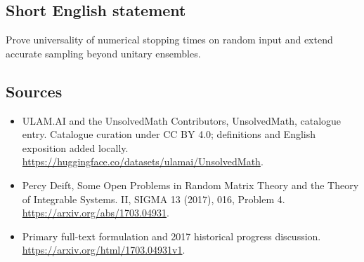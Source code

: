 \documentclass[11pt]{article}
\begin{document}
\subsection{Short English statement}
Prove universality of numerical stopping times on random input and extend accurate sampling beyond unitary ensembles.
\subsection{Sources}
\begin{itemize}
\item[\hypertarget{source:statement:1}{S1}] ULAM.AI and the UnsolvedMath Contributors, UnsolvedMath, catalogue entry. Catalogue curation under CC BY 4.0; definitions and English exposition added locally.
\url{https://huggingface.co/datasets/ulamai/UnsolvedMath}.
\item[\hypertarget{source:statement:2}{S2}] Percy Deift, Some Open Problems in Random Matrix Theory and the Theory of Integrable Systems. II, SIGMA 13 (2017), 016, Problem 4.
\url{https://arxiv.org/abs/1703.04931}.
\item[\hypertarget{source:statement:3}{S3}] Primary full-text formulation and 2017 historical progress discussion.
\url{https://arxiv.org/html/1703.04931v1}.
\end{itemize}
\label{end:statement}
\end{document}

